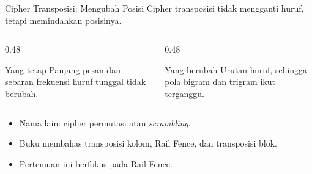 \documentclass[aspectratio=169,11pt]{beamer}
\begin{document}
\begin{frame}{Cipher Transposisi: Mengubah Posisi}
    Cipher transposisi tidak mengganti huruf, tetapi memindahkan posisinya.
    \begin{columns}[T,onlytextwidth]
        \begin{column}{0.48\textwidth}
            \begin{block}{Yang tetap}
                \footnotesize
                Panjang pesan dan sebaran frekuensi huruf tunggal tidak
                berubah.
            \end{block}
        \end{column}
        \begin{column}{0.48\textwidth}
            \begin{alertblock}{Yang berubah}
                \footnotesize
                Urutan huruf, sehingga pola bigram dan trigram ikut terganggu.
            \end{alertblock}
        \end{column}
    \end{columns}
    \vspace{0.15cm}
    \begin{itemize}
        \item Nama lain: cipher permutasi atau \textit{scrambling}.
        \item Buku membahas transposisi kolom, Rail Fence, dan transposisi
              blok.
        \item Pertemuan ini berfokus pada Rail Fence.
    \end{itemize}
\end{frame}
\end{document}

